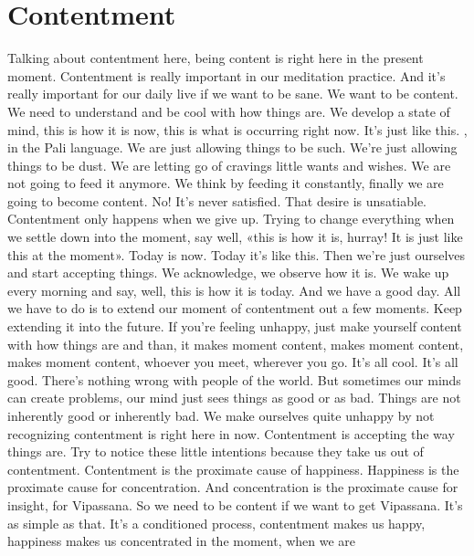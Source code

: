 \documentclass[letterpaper,10pt,english]{sphinxmanual}
\begin{document}
\section{Contentment}
\label{\detokenize{5-a:contentment}}
\sphinxAtStartPar
Talking about contentment here, being content is right here in the present moment. Contentment is really important in our meditation practice. And
it’s really important for our daily live if we want to be sane. We want to be
content. We need to understand and be cool with how things are. We develop
a state of mind, this is how it is now, this is what is occurring right now. It’s
just like this.
,
in the Pali language. We
are just allowing things to be such. We’re just allowing things to be dust. We
are letting go of cravings little wants and wishes. We are not going to feed it
anymore. We think by feeding it constantly, finally we are going to become
content. No! It’s never satisfied. That desire is unsatiable. Contentment only
happens when we give up. Trying to change everything when we settle down
into the moment, say well, «this is how it is, hurray! It is just like this at the
moment». Today is now. Today it’s like this. Then we’re just ourselves and
start accepting things. We acknowledge, we observe how it is. We wake up
  every morning and say, well, this is how it is today. And we have a good day.
All we have to do is to extend our moment of contentment out a few
moments. Keep extending it into the future. If you’re feeling unhappy, just
make yourself content with how things are and than, it makes moment content,  makes  moment  content,  makes  moment  content,  whoever  you  meet,
wherever  you  go.  It’s  all  cool.  It’s  all  good.  There’s  nothing  wrong  with
people  of  the  world.  But  sometimes  our  minds  can  create  problems,  our
mind just sees things as good or as bad. Things are not inherently good or
inherently bad. We make ourselves quite unhappy by not recognizing contentment is right here in now. Contentment is accepting the way things are.
Try to notice these little intentions because they take us out of contentment.
Contentment  is  the  proximate  cause  of  happiness.  Happiness  is  the
proximate cause for concentration. And concentration is the proximate cause
for insight, for Vipassana. So we need to be content if we want to get Vipassana.  It’s  as  simple  as  that.  It’s  a  conditioned  process,  contentment  makes
us  happy,  happiness  makes  us  concentrated  in  the  moment,  when  we  are
\end{document}
